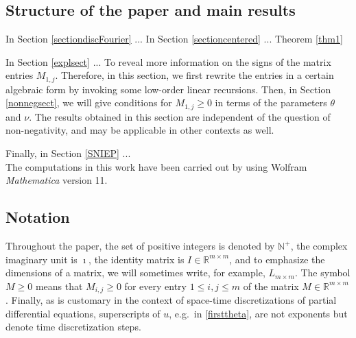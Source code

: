 \documentclass[a4paper]{article}
\newcommand{\te}{\theta}
\newcommand{\nplus}{\mathbb{N}^+}
\newcommand{\rr}{\mathbb{R}}
\begin{document}
\subsection{Structure of the paper and main results}
In Section \ref{sectiondiscFourier} ... In Section \ref{sectioncentered} ... Theorem \ref{thm1} 

In Section \ref{explsect} ...  To reveal more information on the signs of the matrix entries $M_{1,j}$. Therefore, in this section, we first rewrite the  entries in a certain algebraic form by invoking some low-order linear recursions. Then, in Section \ref{nonnegsect}, we will give conditions for $M_{1,j}\ge 0$ in terms of the parameters $\te$ and $\nu$.
The results obtained in this section are independent of the question of non-negativity, and may be applicable in other contexts as well.\\

Finally, in Section \ref{SNIEP} ...\\

The computations in this work have been carried out by using Wolfram \textit{Mathematica} version 11.


\subsection{Notation}
Throughout the paper, the set of positive integers is denoted by $\nplus$, the complex imaginary unit is $\imath$, the identity matrix is $I\in\rr^{m\times m}$, and to emphasize the dimensions of a matrix, we will sometimes write, for example, $L_{m\times m}$.
The symbol $M\ge 0$ means that  $M_{i,j}\ge 0$ for every entry $1\le i, j\le m$ of the matrix $M\in\mathbb{R}^{m\times m}$. Finally, as is customary in the context of space-time discretizations of partial differential equations, superscripts of $u$, e.g.~in \eqref{firsttheta}, are not exponents but denote time discretization steps.  





\end{document}
